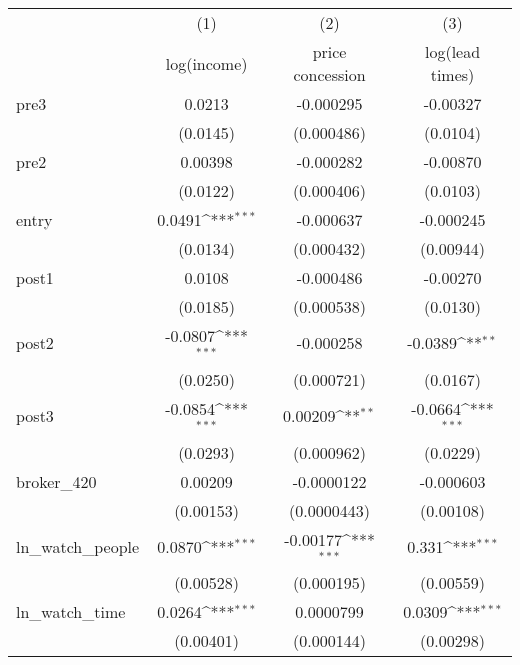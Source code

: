 {
\def\sym#1{\ifmmode^{#1}\else\(^{#1}\)\fi}
\begin{tabular}{l*{3}{c}}
\toprule
            &\multicolumn{1}{c}{(1)}&\multicolumn{1}{c}{(2)}&\multicolumn{1}{c}{(3)}\\
            &\multicolumn{1}{c}{log(income)}&\multicolumn{1}{c}{price concession}&\multicolumn{1}{c}{log(lead times)}\\
\midrule
pre3        &      0.0213         &   -0.000295         &    -0.00327         \\
            &    (0.0145)         &  (0.000486)         &    (0.0104)         \\
\addlinespace
pre2        &     0.00398         &   -0.000282         &    -0.00870         \\
            &    (0.0122)         &  (0.000406)         &    (0.0103)         \\
\addlinespace
entry       &      0.0491\sym{***}&   -0.000637         &   -0.000245         \\
            &    (0.0134)         &  (0.000432)         &   (0.00944)         \\
\addlinespace
post1       &      0.0108         &   -0.000486         &    -0.00270         \\
            &    (0.0185)         &  (0.000538)         &    (0.0130)         \\
\addlinespace
post2       &     -0.0807\sym{***}&   -0.000258         &     -0.0389\sym{**} \\
            &    (0.0250)         &  (0.000721)         &    (0.0167)         \\
\addlinespace
post3       &     -0.0854\sym{***}&     0.00209\sym{**} &     -0.0664\sym{***}\\
            &    (0.0293)         &  (0.000962)         &    (0.0229)         \\
\addlinespace
broker\_420  &     0.00209         &  -0.0000122         &   -0.000603         \\
            &   (0.00153)         & (0.0000443)         &   (0.00108)         \\
\addlinespace
ln\_watch\_people&      0.0870\sym{***}&    -0.00177\sym{***}&       0.331\sym{***}\\
            &   (0.00528)         &  (0.000195)         &   (0.00559)         \\
\addlinespace
ln\_watch\_time&      0.0264\sym{***}&   0.0000799         &      0.0309\sym{***}\\
            &   (0.00401)         &  (0.000144)         &   (0.00298)         \\

\end{tabular}}
